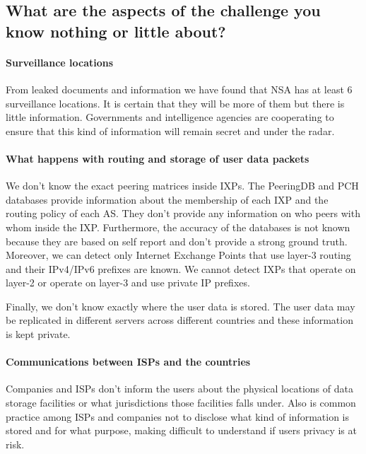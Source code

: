 \subsection{What are the aspects of the challenge you know nothing or little 
about?}

\paragraph{Surveillance locations\\}

From leaked documents and information we have found that NSA has at least 6 
surveillance locations. It is certain that they will be more of them but there 
is little information. Governments and intelligence agencies are cooperating to 
ensure that this kind of information will remain secret and under the radar.

\paragraph{What happens with routing and storage of user data packets\\}

We don't know the exact peering matrices inside IXPs. The PeeringDB and PCH 
databases provide information about the membership of each IXP and the routing 
policy of each AS. They don't provide any information on who peers with whom 
inside the IXP. Furthermore, the accuracy of the databases is not known because 
they are based on self report and don't provide a strong ground truth. Moreover, 
we can detect only Internet Exchange Points that use layer-3 routing and their 
IPv4/IPv6 prefixes are known. We cannot detect IXPs that operate on layer-2 or 
operate on layer-3 and use private IP prefixes. 

Finally, we don't know exactly where the user data is stored. The user data may 
be replicated in different servers across different countries and these 
information is kept private.

\paragraph{Communications between ISPs and the countries\\}
Companies and ISPs don't inform the users about the physical locations of data 
storage facilities or what jurisdictions those facilities falls under. Also is 
common practice among ISPs and companies not to disclose what kind of 
information is stored and for what purpose, making difficult to understand if 
users privacy is at risk.

